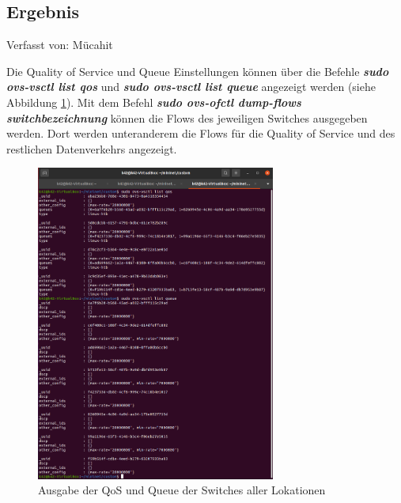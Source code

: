 \documentclass[fontsize=12pt,paper=a4,open=any,parskip=half,
  twoside=false,toc=listof,toc=bibliography,fleqn,leqno,
  captions=nooneline,captions=tableabove,british]{scrbook}
\begin{document}
\subsection{Ergebnis}
{\tiny Verfasst von: Mücahit\par}
Die Quality of Service und Queue Einstellungen können über die Befehle \textit{\textbf{sudo ovs-vsctl list qos}} und \textit{\textbf{sudo ovs-vsctl list queue}} angezeigt werden (siehe Abbildung \ref{queue-qos}). Mit dem Befehl \textit{\textbf{sudo ovs-ofctl dump-flows switchbezeichnung}} können die Flows des jeweiligen Switches ausgegeben werden. Dort werden unteranderem die Flows für die Quality of Service und des restlichen Datenverkehrs angezeigt.

\begin{figure}[H]
 \centering
 \includegraphics[width=0.7\textwidth]{Bilder/queue-qos}
 \captionsetup{justification=centering}
 \caption{Ausgabe der QoS und Queue der Switches aller Lokationen}
 \label{queue-qos}
\end{figure}
\end{document}
